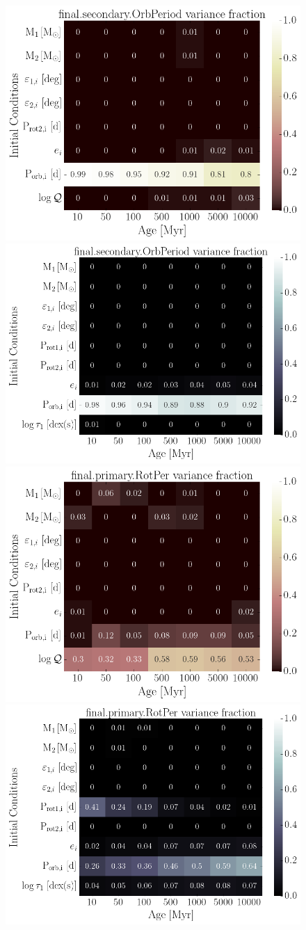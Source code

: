 \documentclass[]{aastex631}
\begin{document}
\begin{figure}[ht!]
\begin{center}
	\includegraphics[width=.49\linewidth]{../figures/sensitivity_cpl_final_secondary_OrbPeriod.png} 
	\includegraphics[width=.49\linewidth]{../figures/sensitivity_ctl_final_secondary_OrbPeriod.png} \\
	\includegraphics[width=.49\linewidth]{../figures/sensitivity_cpl_final_primary_RotPer.png} 
	\includegraphics[width=.49\linewidth]{../figures/sensitivity_ctl_final_primary_RotPer.png} \\

\end{center}
\end{figure}
\end{document}
